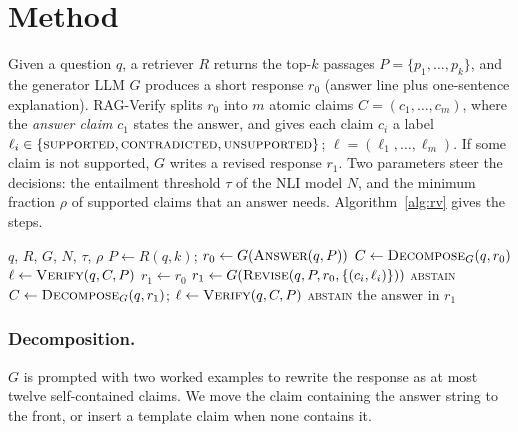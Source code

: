 \documentclass{svproc}
\begin{document}
\section{Method}
Given a question $q$, a retriever $R$ returns the top-$k$ passages $P=\{p_1,\dots,p_k\}$, and the generator LLM $G$ produces a short response $r_0$ (answer line plus one-sentence explanation). RAG-Verify splits $r_0$ into $m$ atomic claims $C=(c_1,\dots,c_m)$, where the \emph{answer claim} $c_1$ states the answer, and gives each claim $c_i$ a label $\ell_i\in\{\textsc{supported},\textsc{contradicted},\textsc{unsupported}\}$; $\ell=(\ell_1,\dots,\ell_m)$. If some claim is not supported, $G$ writes a revised response $r_1$. Two parameters steer the decisions: the entailment threshold $\tau$ of the NLI model $N$, and the minimum fraction $\rho$ of supported claims that an answer needs. Algorithm~\ref{alg:rv} gives the steps.

\begin{algorithm}[htb]
\caption{RAG-Verify (one question)}\label{alg:rv}
\begin{algorithmic}[1]
\REQUIRE $q$, $R$, $G$, $N$, $\tau$, $\rho$
\STATE $P \gets R(q,k)$; \quad $r_0 \gets G(\textsc{Answer}(q,P))$
\STATE $C \gets \textsc{Decompose}_G(q,r_0)$ 
\STATE $\ell \gets \textsc{Verify}(q,C,P)$ 
\STATE $r_1 \gets r_0$
  \STATE $r_1 \gets G(\textsc{Revise}(q,P,r_0,\{(c_i,\ell_i)\}))$
    \RETURN \textsc{abstain}
  \ENDIF
  \STATE $C \gets \textsc{Decompose}_G(q,r_1)$; \quad $\ell \gets \textsc{Verify}(q,C,P)$
\ENDIF
{}
  \RETURN \textsc{abstain}
\ENDIF
\RETURN the answer in $r_1$
\end{algorithmic}
\end{algorithm}

\subsubsection{Decomposition.} $G$ is prompted with two worked examples to rewrite the response as at most twelve self-contained claims. We move the claim containing the answer string to the front, or insert a template claim when none contains it.
\end{document}
